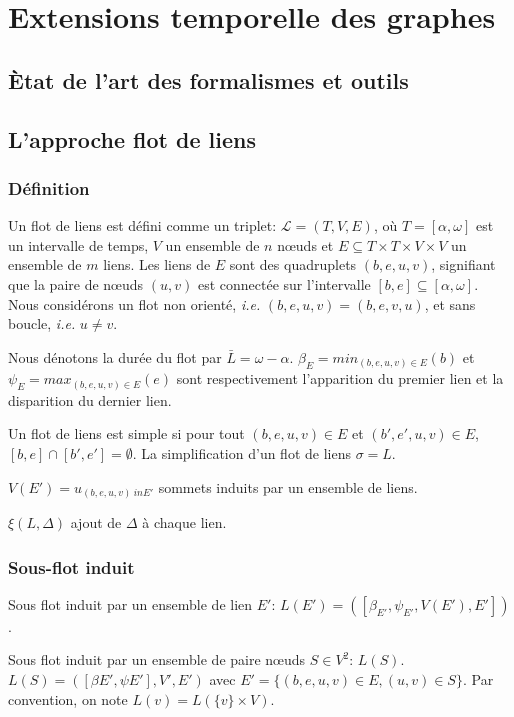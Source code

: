 \chapter{Extensions temporelle des graphes}
\minitoc

\section{\`Etat de l'art des formalismes et outils}

\section{L'approche flot de liens}
\subsection{Définition}
\label{sec:definition}
Un flot de liens est défini comme un triplet: $\mathcal{L}=(T,V,E)$, où $T=[\alpha, \omega]$ est un intervalle de temps, $V$ un ensemble de $n$ n\oe uds et $E\subseteq T\times T \times V \times V$ un ensemble de $m$ liens.
Les liens de $E$ sont des quadruplets $(b,e,u,v)$, signifiant que la paire de n\oe uds $(u, v)$ est connectée sur l'intervalle $[b,e] \subseteq [\alpha,\omega]$.
Nous considérons un flot non orienté, \emph{i.e.} $(b,e,u,v)=(b,e,v,u)$, et sans boucle, \emph{i.e.} $u \neq v$.


Nous dénotons la durée du flot par $\bar{L}=\omega-\alpha$.
$\beta_E= min_{(b,e,u,v) \in E} (b)$ et $\psi_E= max_{(b,e,u,v) \in E} (e)$ sont respectivement l'apparition du premier lien et la disparition du dernier lien.

Un flot de liens est simple si pour tout $(b,e,u,v) \in E$ et $(b',e',u, v) \in E$, $[b,e]\cap [b', e'] = \emptyset$.
La simplification d'un flot de liens $\sigma=L$.

$V(E')= {u}_{(b,e,u,v) \ in E'}$ sommets induits par un ensemble de liens.


$\xi(L,\Delta)$ ajout de $\Delta$ à chaque lien.

\subsection{Sous-flot induit}
Sous flot induit par un ensemble de lien $E'$: $L(E')=([\beta_{E'},\psi_{E'},V(E'),E'])$.


 
Sous flot induit par un ensemble de paire n\oe uds  $S \in V^ 2$: $L(S)$.
$L(S)=([\beta{E'},\psi{E'}],V',E')$ avec $E'= \{(b,e,u,v) \in E, (u,v) \in S\}$.
Par convention, on note $L(v)= L(\{v\}\times V)$.

